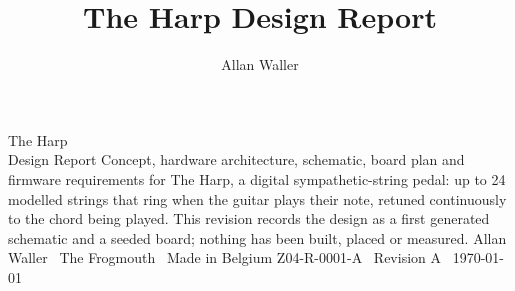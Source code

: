\documentclass[11pt, a4paper, openany]{report}
\title{The Harp Design Report}
\author{Allan Waller}
\begin{document}
\fmtitlepage
  {The Harp\\Design Report}
  {Concept, hardware architecture, schematic, board plan and firmware
   requirements for The Harp, a digital sympathetic-string pedal: up to 24
   modelled strings that ring when the guitar plays their note, retuned
   continuously to the chord being played. This revision records the design
   as a first generated schematic and a seeded board; nothing has been
   built, placed or measured.}
  {Allan Waller \textemdash\ The Frogmouth \textemdash\ Made in Belgium}
  {Z04-R-0001-A \textemdash\ Revision A \textemdash\ \today}

\tableofcontents
\clearpage










\end{document}
